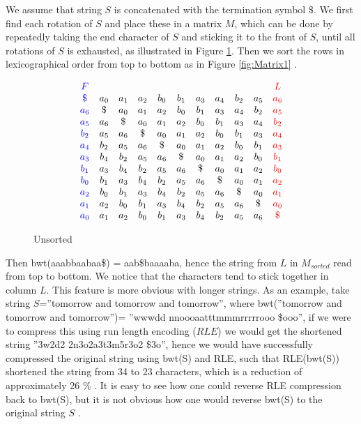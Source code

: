 \documentclass[12pt]{article} %
\begin{document}
We assume that string $S$ is concatenated with the termination symbol $\$$. We first find each rotation of $S$ and place these in a matrix $M$, which can be done by repeatedly taking the end character of $S$ and sticking it to the front of $S$, until all rotations of $S$ is exhausted, as illustrated in Figure \ref{fig:Matrix0}. Then we sort the rows in lexicographical order from top to bottom as in Figure \ref{fig:Matrix1} \cite{bwtfmindex}.

\begin{figure}[H]
\[
\begin{array}{*{11}c}
{\color{blue} F } &  &  & & & & & & & & {\color{red} L }  \\ 
{\color{blue} \$ } & a_0 & a_1 & a_2 & b_0 & b_1 & a_3 & a_4 & b_2 & a_5 & {\color{red} a_6 } \\
{\color{blue} a_6 } & \$ & a_0 & a_1 & a_2 & b_0 & b_1 & a_3 & a_4 & b_2 & {\color{red} a_5 }  \\
{\color{blue} a_5 } & a_6 & \$ & a_0 & a_1 & a_2 & b_0 & b_1 & a_3 & a_4 & {\color{red} b_2 } \\
{\color{blue} b_2  } & a_5 & a_6 & \$ & a_0 & a_1 & a_2 & b_0 & b_1 & a_3 & {\color{red} a_4 } \\
{\color{blue} a_4 }  & b_2 & a_5 & a_6 & \$ & a_0 & a_1 & a_2 & b_0 & b_1 & {\color{red} a_3 } \\
{\color{blue} a_3 }  & b_4 & b_2 & a_5 & a_6 & \$ & a_0 & a_1 & a_2 & b_0 & {\color{red} b_1 } \\
{\color{blue} b_1 }  & a_3 & b_4 & b_2 & a_5 & a_6 & \$ & a_0 & a_1 & a_2 & {\color{red} b_0 }  \\ 
{\color{blue} b_0 }  & b_1 & a_3 & b_4 & b_2 & a_5 & a_6 & \$ & a_0 & a_1 & {\color{red} a_2 } \\
{\color{blue} a_2 } & b_0 & b_1 & a_3 & b_4 & b_2 & a_5 & a_6 & \$ & a_0 & {\color{red} a_1 } \\
{\color{blue} a_1 } & a_2 & b_0 & b_1 & a_3 & b_4 & b_2 & a_5 & a_6 & \$ & {\color{red} a_0 }  \\
{\color{blue} a_0 } & a_1 & a_2 & b_0 & b_1 & a_3 & b_4 & b_2 & a_5 & a_6 & {\color{red} \$ } \\
\end{array}
\]
\captionsetup{width=0.8\textwidth}
\caption{Unsorted}
\label{fig:Matrix0}
\end{figure}

Then bwt(aaabbaabaa\$) = aab\$baaaaba, hence the string from $L$ in $M_{sorted}$ read from top to bottom. We notice that the characters tend to stick together in column $L$. This feature is more obvious with longer strings. As an example, take string $S$=''tomorrow and tomorrow and tomorrow'', where bwt(''tomorrow and tomorrow and tomorrow'')= ''wwwdd  nnoooaatttmmmrrrrrooo  \$ooo'', if we were to compress this using run length encoding ($RLE$) we would get the shortened string ''3w2d2 2n3o2a3t3m5r3o2 \$3o'', hence we would have successfully compressed the original string using bwt(S) and RLE, such that RLE(bwt(S)) shortened the string from 34 to 23 characters, which is a reduction of approximately 26 \% \cite{bwtfmindex}. It is easy to see how one could reverse RLE compression back to bwt(S), but it is not obvious how one would reverse bwt(S) to the original string $S$ \cite{bwtfmindex}.
\end{document}
